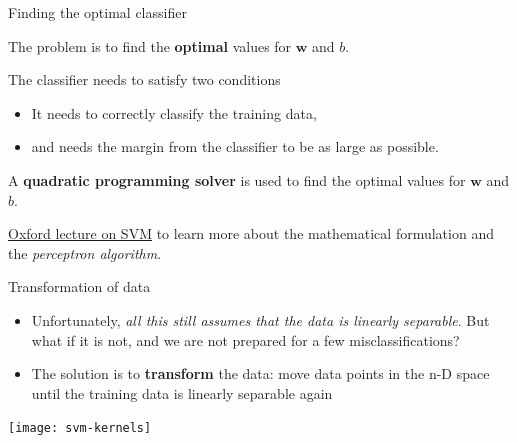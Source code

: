 \documentclass[compress]{beamer}
\begin{document}
\begin{frame}{Finding the optimal classifier}

The problem is to find the \textbf{optimal} values for $\mathbf{w}$ and
$b$.

The classifier needs to satisfy two conditions

\begin{itemize}

\item It needs to correctly classify the training data,
\item and needs the margin from the classifier to be as large as possible.
\end{itemize}

\pause

A \textbf{quadratic programming solver} is used to find the optimal
values for $\mathbf{w}$ and $b$.

{\footnotesize \href{http://www.robots.ox.ac.uk/~az/lectures/ml/lect2.pdf}{Oxford lecture on SVM} to learn more about the mathematical
    formulation and the \emph{perceptron algorithm}.}

\end{frame}

\begin{frame}{Transformation of data}

\begin{itemize}

    \item Unfortunately, \emph{all this still assumes that the data is linearly
        separable}. But what if it is not, and we are not prepared for a few
  misclassifications?
\item The solution is to \textbf{transform} the data: move data points in
  the n-D space until the training data is linearly separable again
\end{itemize}

    \begin{center}
        \texttt{[image: svm-kernels]}
    \end{center}
\end{frame}
\end{document}

